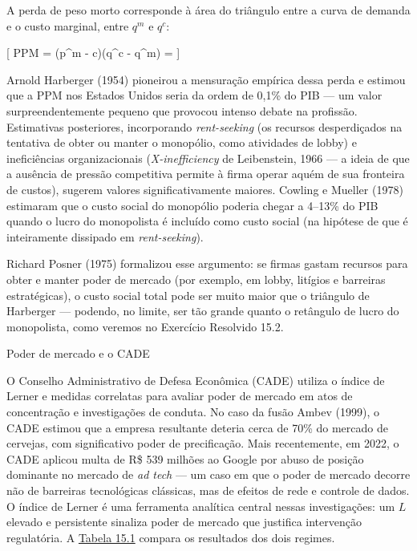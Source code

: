 \documentclass[11pt,twoside,openright]{book}
\begin{document}
A perda de peso morto corresponde à área do triângulo entre a curva de
demanda e o custo marginal, entre \(q^m\) e \(q^c\):

{[} PPM = (p\^{}m - c)(q\^{}c - q\^{}m) = 
\label{eq:15.9}  {]}

Arnold Harberger (1954) pioneirou a mensuração empírica dessa perda e
estimou que a PPM nos Estados Unidos seria da ordem de 0,1\% do PIB ---
um valor surpreendentemente pequeno que provocou intenso debate na
profissão. Estimativas posteriores, incorporando \emph{rent-seeking} (os
recursos desperdiçados na tentativa de obter ou manter o monopólio, como
atividades de lobby) e ineficiências organizacionais
(\emph{X-inefficiency} de Leibenstein, 1966 --- a ideia de que a
ausência de pressão competitiva permite à firma operar aquém de sua
fronteira de custos), sugerem valores significativamente maiores.
Cowling e Mueller (1978) estimaram que o custo social do monopólio
poderia chegar a 4--13\% do PIB quando o lucro do monopolista é incluído
como custo social (na hipótese de que é inteiramente dissipado em
\emph{rent-seeking}).

Richard Posner (1975) formalizou esse argumento: se firmas gastam
recursos para obter e manter poder de mercado (por exemplo, em lobby,
litígios e barreiras estratégicas), o custo social total pode ser muito
maior que o triângulo de Harberger --- podendo, no limite, ser tão
grande quanto o retângulo de lucro do monopolista, como veremos no
Exercício Resolvido 15.2.

\begin{examplebox}{Poder de mercado e o CADE}

O Conselho Administrativo de Defesa Econômica (CADE) utiliza o índice de
Lerner e medidas correlatas para avaliar poder de mercado em atos de
concentração e investigações de conduta. No caso da fusão Ambev (1999),
o CADE estimou que a empresa resultante deteria cerca de 70\% do mercado
de cervejas, com significativo poder de precificação. Mais recentemente,
em 2022, o CADE aplicou multa de R\$ 539 milhões ao Google por abuso de
posição dominante no mercado de \emph{ad tech} --- um caso em que o
poder de mercado decorre não de barreiras tecnológicas clássicas, mas de
efeitos de rede e controle de dados. O índice de Lerner é uma ferramenta
analítica central nessas investigações: um \(L\) elevado e persistente
sinaliza poder de mercado que justifica intervenção regulatória. A
\hyperref[tabela-15-1]{Tabela 15.1} compara os resultados dos dois
regimes.

\end{examplebox}
\end{document}
